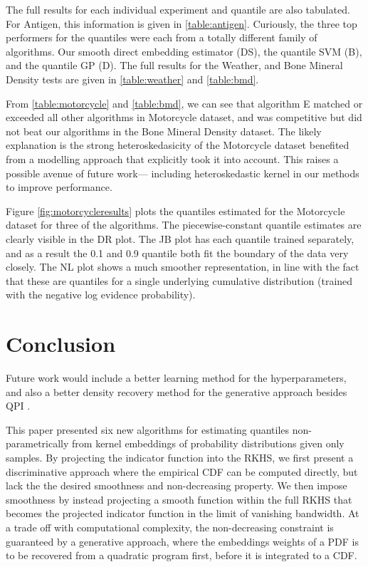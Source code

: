 \documentclass[twoside]{article} \usepackage{aistats2017}
\theoremstyle{definition}
\newcommand{\warn}[1]{{\color{red} #1}}
\newcommand{\qpi}{QPI }
\begin{document}
		The full results for each individual experiment and quantile are also tabulated. For Antigen, this information is given in \cref{table:antigen}. Curiously, the three top performers for the quantiles were each from a totally different family of algorithms. Our smooth direct embedding estimator (DS), the quantile SVM (B), and the quantile GP (D). The full results for the Weather, and Bone Mineral Density tests are given in \cref{table:weather} and \cref{table:bmd}.
		
		From \cref{table:motorcycle} and \cref{table:bmd}, we can see that algorithm E matched or exceeded all other algorithms in Motorcycle dataset, and was competitive but did not beat our algorithms in the Bone Mineral Density dataset. The likely explanation is the strong heteroskedasicity of the Motorcycle dataset benefited from a modelling approach that explicitly took it into account. This raises a possible avenue of future work--- including heteroskedastic kernel in our methods to improve performance.
		
		Figure \ref{fig:motorcycleresults} plots the quantiles estimated for the Motorcycle dataset for three of the algorithms. The piecewise-constant quantile estimates are clearly visible in the DR plot. The JB plot has each quantile trained separately, and as a result the 0.1 and 0.9 quantile both fit the boundary of the data very closely. The NL plot shows a much smoother representation, in line with the fact that these are quantiles for a single underlying cumulative distribution (trained with the negative log evidence probability).

\section{Conclusion}
\label{sec:conclusion}

	\warn{Future work would include a better learning method for the hyperparameters, and also a better density recovery method for the generative approach besides \qpi.}
	
	This paper presented six new algorithms for estimating quantiles non-parametrically from kernel embeddings of probability distributions given only samples. By projecting the indicator function into the RKHS, we first present a discriminative approach where the empirical CDF can be computed directly, but lack the the desired smoothness and non-decreasing property. We then impose smoothness by instead projecting a smooth function within the full RKHS that becomes the projected indicator function in the limit of vanishing bandwidth. At a trade off with computational complexity, the non-decreasing constraint is guaranteed by a generative approach, where the embeddings weights of a PDF is to be recovered from a quadratic program first, before it is integrated to a CDF.
	
\end{document}
